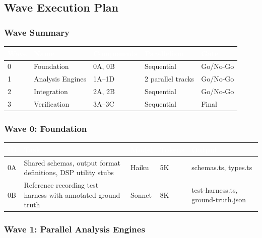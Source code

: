 \documentclass[11pt,letterpaper]{article}
\newcommand{\tableheader}[1]{\textbf{\sffamily\textcolor{white}{#1}}}
\begin{document}
\subsection{Wave Execution Plan}

\subsubsection{Wave Summary}

\begin{center}
\begin{tabularx}{\textwidth}{C{1cm}L{3cm}C{2cm}C{2cm}C{2cm}}
\toprule
{}
\tableheader{Wave} & \tableheader{Name} & \tableheader{Components} & \tableheader{Parallelism} & \tableheader{Gate} \\
 & Foundation & 0A, 0B & Sequential & Go/No-Go \\
1 & Analysis Engines & 1A--1D & 2 parallel tracks & Go/No-Go \\
2 & Integration & 2A, 2B & Sequential & Go/No-Go \\
3 & Verification & 3A--3C & Sequential & Final \\
\bottomrule
\end{tabularx}
\end{center}

\subsubsection{Wave 0: Foundation}

\begin{center}
\begin{tabularx}{\textwidth}{C{0.8cm}L{3cm}L{2cm}C{1.5cm}X}
\toprule
{}
\tableheader{ID} & \tableheader{Task} & \tableheader{Model} & \tableheader{Tokens} & \tableheader{Output} \\
\midrule
0A & Shared schemas, output format definitions, DSP utility stubs & Haiku & 5K & schemas.ts, types.ts \\
0B & Reference recording test harness with annotated ground truth & Sonnet & 8K & test-harness.ts, ground-truth.json \\
\bottomrule
\end{tabularx}
\end{center}

\subsubsection{Wave 1: Parallel Analysis Engines}
\end{document}
